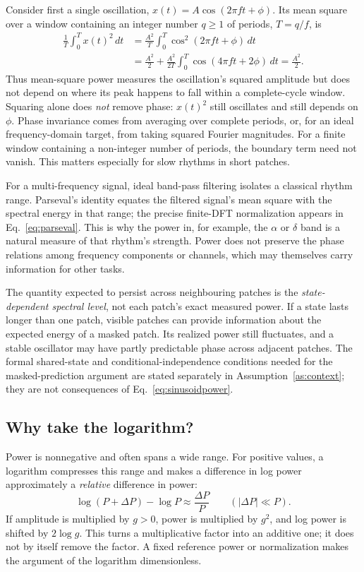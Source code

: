 \documentclass[11pt,a4paper]{article}
\begin{document}
Consider first a single oscillation,
$x(t)=A\cos(2\pi ft+\phi)$. Its mean square over a window containing an integer
number $q\geq1$ of periods, $T=q/f$, is
\begin{align}
\frac{1}{T}\int_0^T x(t)^2\,dt
&=\frac{A^2}{T}\int_0^T\cos^2(2\pi ft+\phi)\,dt\nonumber\\
&=\frac{A^2}{2}
 +\frac{A^2}{2T}\int_0^T\cos(4\pi ft+2\phi)\,dt
 =\frac{A^2}{2}.
\label{eq:sinusoidpower}
\end{align}
Thus mean-square power measures the oscillation's squared amplitude but does not
depend on where its peak happens to fall within a complete-cycle window.
Squaring alone does \emph{not} remove phase: $x(t)^2$ still oscillates and still
depends on $\phi$. Phase invariance comes from averaging over complete periods,
or, for an ideal frequency-domain target, from taking squared Fourier magnitudes.
For a finite window containing a non-integer number of periods, the boundary
term need not vanish. This matters especially for slow rhythms in short patches.

For a multi-frequency signal, ideal band-pass filtering isolates a classical
rhythm range. Parseval's identity equates the filtered signal's mean square
with the spectral energy in that range; the precise finite-DFT normalization
appears in Eq.~\eqref{eq:parseval}. This is why the power in, for example,
the $\alpha$ or $\delta$ band is a natural measure of that rhythm's strength.
Power does not preserve the phase relations among frequency components or
channels, which may themselves carry information for other tasks.

The quantity expected to persist across neighbouring patches is the
\emph{state-dependent spectral level}, not each patch's exact measured power.
If a state lasts longer than one patch, visible patches can provide information
about the expected energy of a masked patch. Its realized power still fluctuates,
and a stable oscillator may have partly predictable phase across adjacent
patches. The formal shared-state and conditional-independence conditions needed
for the masked-prediction argument are stated separately in
Assumption~\ref{as:context}; they are not consequences of Eq.~\eqref{eq:sinusoidpower}.

\subsection{Why take the logarithm?}

Power is nonnegative and often spans a wide range. For positive values, a
logarithm compresses this range and makes a difference in log power approximately
a \emph{relative} difference in power:
\begin{equation}
\log(P+\Delta P)-\log P\approx\frac{\Delta P}{P}
\qquad (|\Delta P|\ll P).
\label{eq:relativechange}
\end{equation}
If amplitude is multiplied by $g>0$, power is multiplied by $g^2$, and log
power is shifted by $2\log g$. This turns a multiplicative factor into an
additive one; it does not by itself remove the factor. A fixed reference power
or normalization makes the argument of the logarithm dimensionless.
\end{document}
